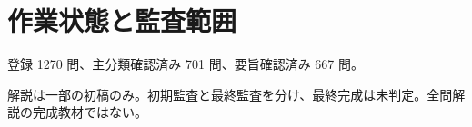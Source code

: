 \chapter{作業状態と監査範囲}
登録 1270 問、主分類確認済み 701 問、要旨確認済み 667 問。
\par 解説は一部の初稿のみ。初期監査と最終監査を分け、最終完成は未判定。全問解説の完成教材ではない。
